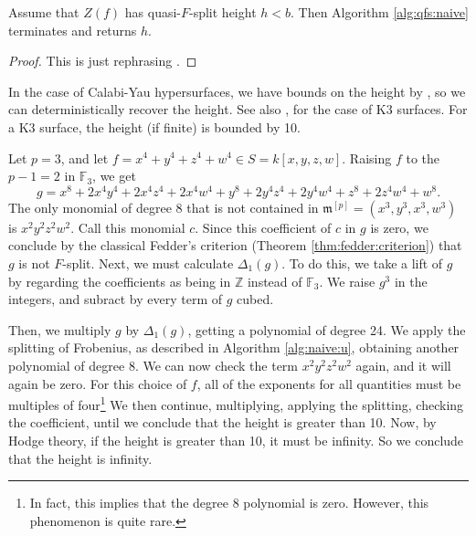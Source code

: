 \begin{thm}
	Assume that
	\(Z(f)\) has quasi-\(F\)-split height \(h < b\).
	Then Algorithm \ref{alg:qfs:naive} terminates
	and returns \(h\).
\end{thm}

\begin{proof}
	This is just rephrasing \cite[Theorem~C]{kty-2022-fedder}.
\end{proof}

In the case of Calabi-Yau hypersurfaces, we have bounds on the height by
\cite{van-der-geer-katsura-2003-calabi-yau},
so we can deterministically recover the height.  
See also \cite[Theorem~0.1]{artin-1974-k3-surfaces},
for the case of K3 surfaces.
For a K3 surface, the height (if finite) is bounded by 10.

\begin{ex}
    Let \(p=3\), and let
    \(f = x^4 + y^4 + z^4 + w^4 \in S = k[x,y,z,w]\).
    Raising \(f\) to the \(p-1 = 2\) in \(\mathbb{F}_{3}\), we get
    \[
    g = x^8 + 2x^4y^4 + 2x^4z^4 + 2x^4w^4 + y^8 + 2y^4z^4 + 2y^4w^4 + z^8 + 2z^4w^4 + w^8
    .\] 
    The only monomial of degree \(8\) that is not contained
    in \(\mathfrak{m}^{[p]} = (x^{3}, y^{3}, x^{3}, w^{3})\) is \(x^{2}y^{2}z^{2}w^{2}\).
    Call this monomial \(c\).
    Since this coefficient of \(c\) in \(g\) is zero, we conclude
    by the classical Fedder's criterion (Theorem \ref{thm:fedder:criterion})
    that \(g\) is not \(F\)-split.
    Next, we must calculate \(\Delta_{1}(g)\).
    To do this, we take a lift of \(g\) by regarding the coefficients
    as being in \(\mathbb{Z}\) instead of \(\mathbb{F}_{3}\).
    We raise \(g^3\) in the integers, and subract by every term of \(g\) 
    cubed.

    Then, we multiply \(g\) by \(\Delta_{1}(g)\), getting a polynomial of degree 24.
    We apply the splitting of Frobenius, as described in Algorithm \ref{alg:naive:u}, 
    obtaining another polynomial of degree \(8\). 
    We can now check the term \(x^2y^2z^2w^2\) again, and it will again be zero. 
    For this choice of $f$, all of the exponents for all quantities 
    must be multiples of four\footnote{
    In fact, this implies that the degree \(8\) polynomial is zero.
    However, this phenomenon is quite rare.
    }
    We then continue, multiplying, applying the splitting, checking the coefficient, 
    until we conclude that the height is greater than 10. 
    Now, by Hodge theory, if the height is greater than 10, it must be infinity. 
    So we conclude that the height is infinity.
\end{ex}

